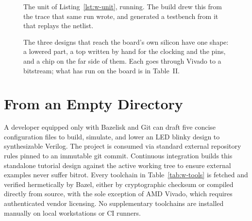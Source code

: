 \documentclass[journal,9pt]{IEEEtran}
\begin{document}
\begin{figure}[htbp]
\centering

\caption{The unit of Listing~\ref{lst:w-unit}, running. The build drew
this from the trace that same run wrote, and generated a testbench
from it that replays the netlist.}
\label{fig:w-wave}
\end{figure}

\begin{figure}[htbp]
\centering
{}
\caption{The three designs that reach the board's own silicon have one
shape: a lowered part, a top written by hand for the clocking and the
pins, and a chip on the far side of them. Each goes through Vivado to
a bitstream; what has run on the board is in Table~II.}
\label{fig:s-boards}
\end{figure}

\section{From an Empty Directory}

A developer equipped only with Bazelisk and Git can draft five concise
configuration files to build, simulate, and lower an LED blinky design to
synthesizable Verilog. The project is consumed via standard external repository
rules pinned to an immutable git commit. Continuous integration builds this
standalone tutorial design against the active working tree to ensure external
examples never suffer bitrot. Every toolchain in Table~\ref{tab:w-tools} is
fetched and verified hermetically by Bazel, either by cryptographic checksum
or compiled directly from source, with the sole exception of AMD Vivado, which
requires authenticated vendor licensing. No supplementary toolchains are
installed manually on local workstations or CI runners.
\end{document}
